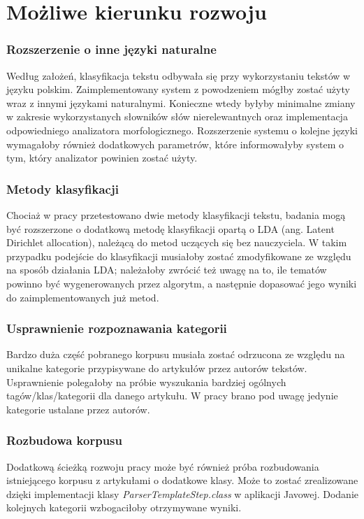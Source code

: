 \section{Możliwe kierunku rozwoju}

\subsubsection*{Rozszerzenie o inne języki naturalne}
Według założeń, klasyfikacja tekstu odbywała się przy wykorzystaniu tekstów w języku polskim. Zaimplementowany system z powodzeniem mógłby zostać użyty wraz z innymi językami naturalnymi. Konieczne wtedy byłyby minimalne zmiany w zakresie wykorzystanych słowników słów nierelewantnych oraz implementacja odpowiedniego analizatora morfologicznego. Rozszerzenie systemu o kolejne języki wymagałoby również dodatkowych parametrów, które informowałyby system o tym, który analizator powinien zostać użyty.

\subsubsection*{Metody klasyfikacji}
Chociaż w pracy przetestowano dwie metody klasyfikacji tekstu, badania mogą być rozszerzone o dodatkową metodę klasyfikacji opartą o LDA (ang. Latent Dirichlet allocation), należącą do metod uczących się bez nauczyciela. W takim przypadku podejście do klasyfikacji musiałoby zostać zmodyfikowane ze względu na sposób działania LDA; należałoby zwrócić też uwagę na to, ile tematów powinno być wygenerowanych przez algorytm, a następnie dopasować jego wyniki do zaimplementowanych już metod.

\subsubsection*{Usprawnienie rozpoznawania kategorii}
Bardzo duża część pobranego korpusu musiała zostać odrzucona ze względu na unikalne kategorie przypisywane do artykułów przez autorów tekstów. Usprawnienie polegałoby na próbie wyszukania bardziej ogólnych tagów/klas/kategorii dla danego artykułu. W pracy brano pod uwagę jedynie kategorie ustalane przez autorów.

\subsubsection*{Rozbudowa korpusu}
Dodatkową ścieżką rozwoju pracy może być również próba rozbudowania istniejącego korpusu z artykułami o dodatkowe klasy. Może to zostać zrealizowane dzięki implementacji klasy \textit{ParserTemplateStep.class} w aplikacji Javowej. Dodanie kolejnych kategorii wzbogaciłoby otrzymywane wyniki.   